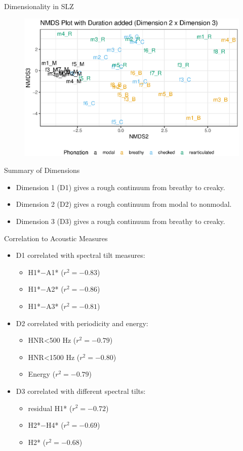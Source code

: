 \documentclass[professionalfonts]{beamer}
\begin{document}
\begin{frame}{Dimensionality in SLZ}
  \begin{figure}
    \centering
    \includegraphics[width = 0.8\linewidth]{images/MDS/nmds23_dur.eps}
  \end{figure}
\end{frame}

\begin{frame}{Summary of Dimensions}
  \begin{itemize}
    \item Dimension 1 (D1) gives a rough continuum from breathy to creaky.
    \item Dimension 2 (D2) gives a rough continuum from modal to nonmodal.
    \item Dimension 3 (D3) gives a rough continuum from breathy to creaky.
  \end{itemize}
\end{frame}

\begin{frame}{Correlation to Acoustic Measures}
  \begin{itemize}
    \item D1 correlated with spectral tilt measures: 
    \begin{itemize}
      \item H1*$-$A1* ($r^2 = -0.83$) 
      \item H1*$-$A2* ($r^2 = -0.86$)
      \item H1*$-$A3* ($r^2 = -0.81$)
    \end{itemize}
    \item D2 correlated with periodicity and energy: 
    \begin{itemize}
      \item HNR\textless 500 Hz ($r^2 = -0.79$)
      \item HNR\textless 1500 Hz ($r^2 = -0.80$)
      \item Energy ($r^2 = -0.79$)
    \end{itemize}
    \item D3 correlated with different spectral tilts:
    \begin{itemize}
      \item residual H1* ($r^2 = -0.72$)
      \item H2*$-$H4* ($r^2 = -0.69$)
      \item H2* ($r^2 = -0.68$)
    \end{itemize}
  \end{itemize}
\end{frame}
\end{document}
